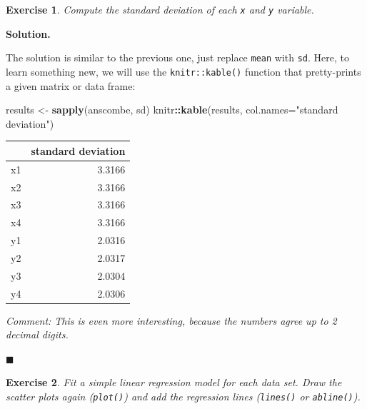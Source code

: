 \documentclass[10pt,b5paper,krantz1]{krantz}
\newenvironment{Shaded}{\begin{snugshade}}{\end{snugshade}}
\newcommand{\DataTypeTok}[1]{\textcolor[rgb]{0.27,0.27,0.27}{#1}}
\newcommand{\KeywordTok}[1]{\textcolor[rgb]{0.27,0.27,0.27}{\textbf{#1}}}
\newcommand{\NormalTok}[1]{#1}
\newcommand{\OperatorTok}[1]{\textcolor[rgb]{0.43,0.43,0.43}{\textbf{#1}}}
\newcommand{\StringTok}[1]{\textcolor[rgb]{0.5,0.5,0.5}{#1}}
\newtheorem{exercise}{Exercise}[chapter]
\newenvironment{solution}{%
\bigskip\noindent\textbf{Solution. }%
\it\ignorespaces%
\ignorespaces%
}{\ignorespaces%
\hfill$\blacksquare$%
}
\begin{document}
\begin{exercise}

Compute the standard deviation of each \texttt{x} and \texttt{y} variable.

\end{exercise}

\begin{solution}

The solution is similar to the previous one, just replace \texttt{mean} with \texttt{sd}.
Here, to learn something new, we will use the \texttt{knitr::kable()} function
that pretty-prints a given matrix or data frame:

\begin{Shaded}
\begin{Highlighting}[]
\NormalTok{results <-}\StringTok{ }\KeywordTok{sapply}\NormalTok{(anscombe, sd)}
\NormalTok{knitr}\OperatorTok{::}\KeywordTok{kable}\NormalTok{(results, }\DataTypeTok{col.names=}\StringTok{"standard deviation"}\NormalTok{)}
\end{Highlighting}
\end{Shaded}

\begin{longtable}[]{@{}lr@{}}
\toprule
& standard deviation\tabularnewline
\midrule
\endhead
x1 & 3.3166\tabularnewline
x2 & 3.3166\tabularnewline
x3 & 3.3166\tabularnewline
x4 & 3.3166\tabularnewline
y1 & 2.0316\tabularnewline
y2 & 2.0317\tabularnewline
y3 & 2.0304\tabularnewline
y4 & 2.0306\tabularnewline
\bottomrule
\end{longtable}

\emph{Comment: This is even more interesting, because the numbers agree up to 2 decimal digits.}

\end{solution}

\begin{exercise}

Fit a simple linear regression model for each data set.
Draw the scatter plots again (\texttt{plot()})
and add the regression lines (\texttt{lines()} or \texttt{abline()}).

\end{exercise}
\end{document}
